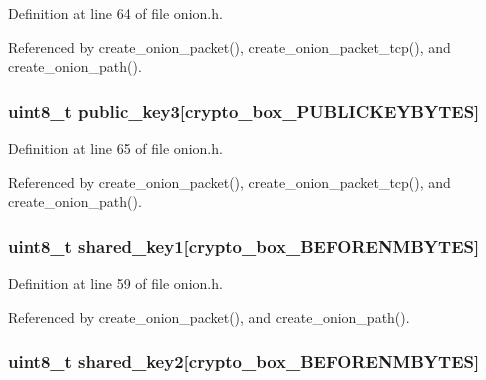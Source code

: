 Definition at line 64 of file onion.\+h.



Referenced by create\+\_\+onion\+\_\+packet(), create\+\_\+onion\+\_\+packet\+\_\+tcp(), and create\+\_\+onion\+\_\+path().

\hypertarget{struct_onion___path_a0fa442ed05e4279ea8bcb1d039724f2b}{
\subsubsection[{public\+\_\+key3}]{\setlength{\rightskip}{0pt plus 5cm}uint8\+\_\+t public\+\_\+key3\mbox{[}crypto\+\_\+box\+\_\+\+P\+U\+B\+L\+I\+C\+K\+E\+Y\+B\+Y\+T\+E\+S\mbox{]}}}\label{struct_onion___path_a0fa442ed05e4279ea8bcb1d039724f2b}


Definition at line 65 of file onion.\+h.



Referenced by create\+\_\+onion\+\_\+packet(), create\+\_\+onion\+\_\+packet\+\_\+tcp(), and create\+\_\+onion\+\_\+path().

\hypertarget{struct_onion___path_ac38c2cdd308cce10c53e276cb664c644}{
\subsubsection[{shared\+\_\+key1}]{\setlength{\rightskip}{0pt plus 5cm}uint8\+\_\+t shared\+\_\+key1\mbox{[}crypto\+\_\+box\+\_\+\+B\+E\+F\+O\+R\+E\+N\+M\+B\+Y\+T\+E\+S\mbox{]}}}\label{struct_onion___path_ac38c2cdd308cce10c53e276cb664c644}


Definition at line 59 of file onion.\+h.



Referenced by create\+\_\+onion\+\_\+packet(), and create\+\_\+onion\+\_\+path().

\hypertarget{struct_onion___path_a677ff69e40fecc070cfe5ebe1f4ecb71}{
\subsubsection[{shared\+\_\+key2}]{\setlength{\rightskip}{0pt plus 5cm}uint8\+\_\+t shared\+\_\+key2\mbox{[}crypto\+\_\+box\+\_\+\+B\+E\+F\+O\+R\+E\+N\+M\+B\+Y\+T\+E\+S\mbox{]}}}\label{struct_onion___path_a677ff69e40fecc070cfe5ebe1f4ecb71}



